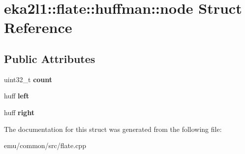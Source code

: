 \hypertarget{structeka2l1_1_1flate_1_1huffman_1_1node}{}\section{eka2l1\+:\+:flate\+:\+:huffman\+:\+:node Struct Reference}
\label{structeka2l1_1_1flate_1_1huffman_1_1node}
\subsection*{Public Attributes}
\begin{DoxyCompactItemize}
\item 
\mbox{\label{structeka2l1_1_1flate_1_1huffman_1_1node_af0217624b9ec34058551d6d813c5aee1}} 
uint32\+\_\+t {\bfseries count}
\item 
\mbox{\label{structeka2l1_1_1flate_1_1huffman_1_1node_a3f79deeb8f77d0d0dab854a9ece43422}} 
huff {\bfseries left}
\item 
\mbox{\label{structeka2l1_1_1flate_1_1huffman_1_1node_ab7ee443a717b581d4b7bc0443441420b}} 
huff {\bfseries right}
\end{DoxyCompactItemize}


The documentation for this struct was generated from the following file\+:\begin{DoxyCompactItemize}
\item 
emu/common/src/flate.\+cpp\end{DoxyCompactItemize}
